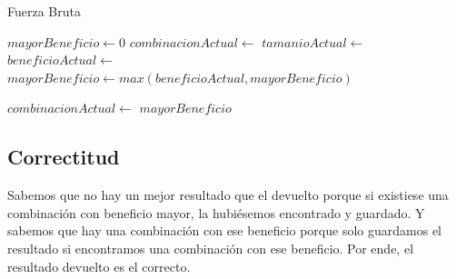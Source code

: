 \documentclass[10pt, a4paper]{article}
\begin{document}
\pagebreak
\begin{algorithm}
\caption{Fuerza Bruta}
\begin{algorithmic}[1]
	\State $mayorBeneficio \gets 0$
	\State $combinacionActual \gets $
		\State $tamanioActual \gets $
			\State $beneficioActual \gets $
			\State $mayorBeneficio \gets max(beneficioActual, mayorBeneficio)$
		\EndIf

		\State $combinacionActual \gets $
	\EndWhile
	\State \Return $mayorBeneficio$
\EndFunction
\end{algorithmic}
\end{algorithm}

\subsection{Correctitud}
Sabemos que no hay un mejor resultado que el devuelto porque si existiese una combinación con beneficio mayor, la hubiésemos encontrado y guardado. Y sabemos que hay una combinación con ese beneficio porque solo guardamos el resultado si encontramos una combinación con ese beneficio. Por ende, el resultado devuelto es el correcto. \par
\end{document}
